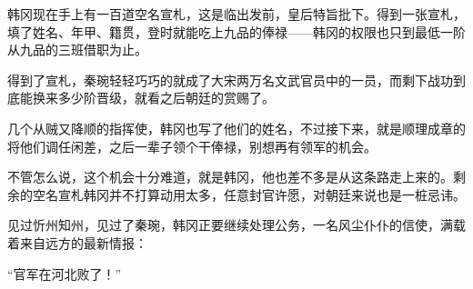 韩冈现在手上有一百道空名宣札，这是临出发前，皇后特旨批下。得到一张宣札，填了姓名、年甲、籍贯，登时就能吃上九品的俸禄——韩冈的权限也只到最低一阶从九品的三班借职为止。

得到了宣札，秦琬轻轻巧巧的就成了大宋两万名文武官员中的一员，而剩下战功到底能换来多少阶晋级，就看之后朝廷的赏赐了。

几个从贼又降顺的指挥使，韩冈也写了他们的姓名，不过接下来，就是顺理成章的将他们调任闲差，之后一辈子领个干俸禄，别想再有领军的机会。

不管怎么说，这个机会十分难道，就是韩冈，他也差不多是从这条路走上来的。剩余的空名宣札韩冈并不打算动用太多，任意封官许愿，对朝廷来说也是一桩忌讳。

见过忻州知州，见过了秦琬，韩冈正要继续处理公务，一名风尘仆仆的信使，满载着来自远方的最新情报：

“官军在河北败了！”
